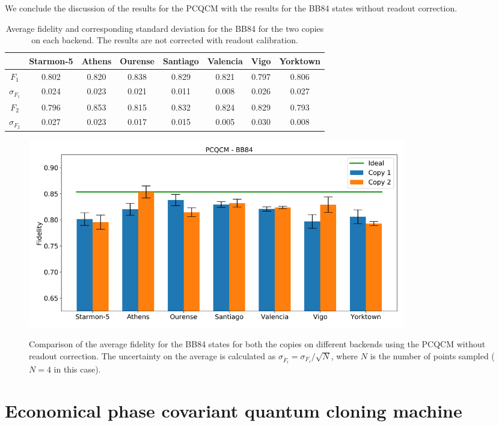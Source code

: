 We conclude the discussion of the results for the PCQCM with the results for the BB84 states without readout correction.
\begin{table}[H]
    \centering
    \begin{tabular}{|c|c|c|c|c|c|c|c|}
    \hline
    \textbf{} & \textbf{Starmon-5} & \textbf{Athens} & \textbf{Ourense} & \textbf{Santiago} & \textbf{Valencia} & \textbf{Vigo} & \textbf{Yorktown} \\ \hline
    $F_1$              & 0.802 & 0.820 & 0.838 & 0.829 & 0.821 & 0.797 & 0.806 \\ \hline
    $\sigma_{F_1}$     & 0.024 & 0.023 & 0.021 & 0.011 & 0.008 & 0.026 & 0.027 \\ \hline
    $F_2$              & 0.796 & 0.853 & 0.815 & 0.832 & 0.824 & 0.829 & 0.793 \\ \hline
    $\sigma_{F_2}$     & 0.027 & 0.023 & 0.017 & 0.015 & 0.005 & 0.030 & 0.008 \\ \hline
    \end{tabular}
    \caption{Average fidelity and corresponding standard deviation for the BB84 for the two copies on each backend. The results are not corrected with readout calibration.}
    \label{tab:results_pcqcm_bb84_not_corrected}
\end{table}
\begin{figure}[H]
  \centering
          \includegraphics[width=0.8\textwidth]{Figures/PhaseCovariant/Histograms/histo_bb84.png}
      \label{fig:pc_histo_bb84_corrected}
      \caption{Comparison of the average fidelity for the BB84 states for both the copies on different backends using the PCQCM without readout correction. The uncertainty on the average is calculated as $\sigma_{\overline{F}_i}=\sigma_{F_i}/\sqrt{N}$, where $N$ is the number of points sampled ($N=4$ in this case).}
\end{figure}

\section{Economical phase covariant quantum cloning machine}
